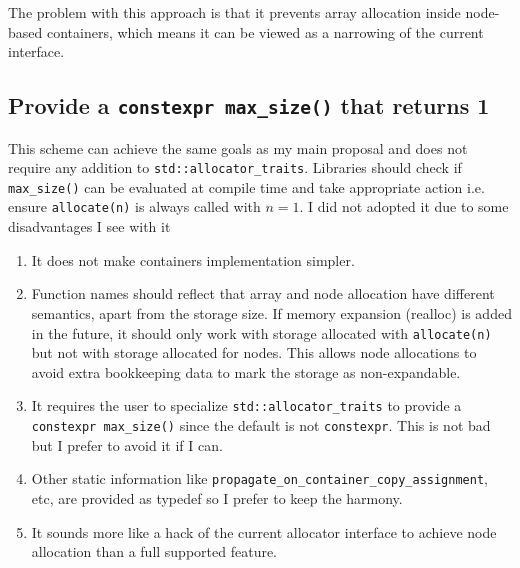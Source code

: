 \documentclass[11pt]{article}
\begin{document}
The problem with this approach is that it prevents array allocation inside
node-based containers, which means it can be viewed as a narrowing of the
current interface.

\subsection{Provide a \texttt{constexpr max\_size()} that returns 1}


This scheme
can achieve the same goals as my main proposal and does not require any
addition to \texttt{std::allocator\_traits}. Libraries should check if
\texttt{max\_size()} can be evaluated at compile time and take appropriate
action i.e. ensure \texttt{allocate(n)} is always called with $n = 1$.
I did not adopted it due to some disadvantages I see with it

\begin{enumerate}
\item It does not make containers implementation simpler.

\item Function names should reflect that array and node allocation have
different semantics, apart from the storage size. If memory expansion (realloc)
is added in the future, it should only work with storage allocated with
\texttt{allocate(n)} but not with storage allocated for nodes. This allows node
allocations to avoid extra bookkeeping data to mark the storage as
non-expandable.

\item It requires the user to specialize \texttt{std::allocator\_traits} to
provide a \texttt{constexpr max\_size()} since the default is not
\texttt{constexpr}. This is not bad but I prefer to avoid it if I can.

\item Other static information like \texttt{propagate\_on\_container\_copy\_assignment}, etc,
are provided as typedef so I prefer to keep the harmony.

\item It sounds more like a hack of the current allocator interface to achieve
node allocation than a full supported feature.

\end{enumerate}

\newpage
\end{document}
